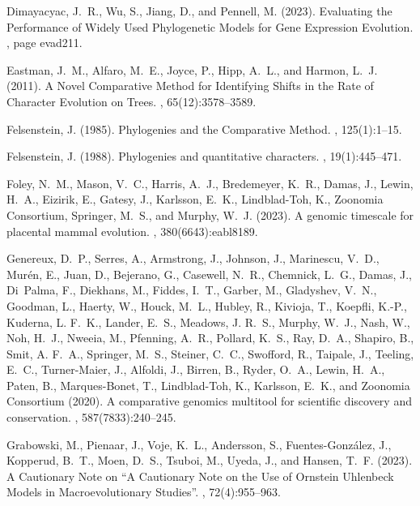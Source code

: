 \documentclass{article}
\begin{document}
\begin{thebibliography}{}
Dimayacyac, J.~R., Wu, S., Jiang, D., and Pennell, M. (2023).
\newblock Evaluating the {{Performance}} of {{Widely Used Phylogenetic Models}}
  for {{Gene Expression Evolution}}.
, page evad211.

Eastman, J.~M., Alfaro, M.~E., Joyce, P., Hipp, A.~L., and Harmon, L.~J.
  (2011).
\newblock A {{Novel Comparative Method}} for {{Identifying Shifts}} in the
  {{Rate}} of {{Character Evolution}} on {{Trees}}.
, 65(12):3578--3589.

Felsenstein, J. (1985).
\newblock Phylogenies and the {{Comparative Method}}.
, 125(1):1--15.

Felsenstein, J. (1988).
\newblock Phylogenies and quantitative characters.
, 19(1):445--471.

Foley, N.~M., Mason, V.~C., Harris, A.~J., Bredemeyer, K.~R., Damas, J., Lewin,
  H.~A., Eizirik, E., Gatesy, J., Karlsson, E.~K., {Lindblad-Toh}, K.,
  {Zoonomia Consortium}, Springer, M.~S., and Murphy, W.~J. (2023).
\newblock A genomic timescale for placental mammal evolution.
, 380(6643):eabl8189.

Genereux, D.~P., Serres, A., Armstrong, J., Johnson, J., Marinescu, V.~D.,
  Mur{\'e}n, E., Juan, D., Bejerano, G., Casewell, N.~R., Chemnick, L.~G.,
  Damas, J., Di~Palma, F., Diekhans, M., Fiddes, I.~T., Garber, M., Gladyshev,
  V.~N., Goodman, L., Haerty, W., Houck, M.~L., Hubley, R., Kivioja, T.,
  Koepfli, K.-P., Kuderna, L. F.~K., Lander, E.~S., Meadows, J. R.~S., Murphy,
  W.~J., Nash, W., Noh, H.~J., Nweeia, M., Pfenning, A.~R., Pollard, K.~S.,
  Ray, D.~A., Shapiro, B., Smit, A. F.~A., Springer, M.~S., Steiner, C.~C.,
  Swofford, R., Taipale, J., Teeling, E.~C., {Turner-Maier}, J., Alfoldi, J.,
  Birren, B., Ryder, O.~A., Lewin, H.~A., Paten, B., {Marques-Bonet}, T.,
  {Lindblad-Toh}, K., Karlsson, E.~K., and {Zoonomia Consortium} (2020).
\newblock A comparative genomics multitool for scientific discovery and
  conservation.
, 587(7833):240--245.

Grabowski, M., Pienaar, J., Voje, K.~L., Andersson, S., {Fuentes-Gonz{\'a}lez},
  J., Kopperud, B.~T., Moen, D.~S., Tsuboi, M., Uyeda, J., and Hansen, T.~F.
  (2023).
\newblock A {{Cautionary Note}} on ``{{A Cautionary Note}} on the {{Use}} of
  {{Ornstein Uhlenbeck Models}} in {{Macroevolutionary Studies}}''.
, 72(4):955--963.


\end{thebibliography}
\end{document}
